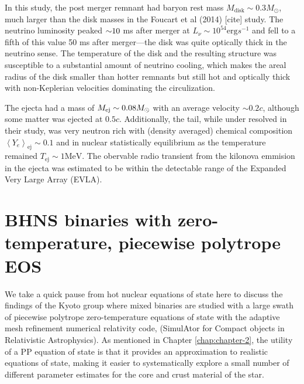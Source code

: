 In this study, the post merger remnant had baryon rest mass $M_\textrm{disk} \sim 0.3 M_\odot$, much larger than the disk masses in the Foucart et al (2014) [cite] study.  The neutrino luminosity peaked $\mathord{\sim} 10$ ms after merger at $L_\nu \sim 10^{54} \textrm{erg} s^{-1}$ and fell to a fifth of this value 50 ms after merger---the disk was quite optically thick in the neutrino sense.  The temperature of the disk and the resulting structure was susceptible to a substantial amount of neutrino cooling, which makes the areal radius of the disk smaller than hotter remnants but still hot and optically thick with non-Keplerian velocities dominating the circulization.

The ejecta had a mass of $M_{\rm ej} \sim 0.08 M_\odot$ with an average velocity $\sim 0.2 c$, although some matter was ejected at $0.5 c$. Additionally, the tail, while under resolved in their study, was very neutron rich with (density averaged) chemical composition $\left\langle Y_e \right\rangle_\textrm{ej} \sim 0.1$  and in nuclear statistically equilibrium as the temperature remained $T_\textrm{ej} \sim 1 \textrm{MeV}$.  The obervable radio transient from the kilonova emmision in the ejecta was estimated to be within the detectable range of the Expanded Very Large Array (EVLA).

\section{BHNS binaries with zero-temperature, piecewise polytrope EOS}

We take a quick pause from hot nuclear equations of state here to discuss the findings of the Kyoto group where mixed binaries are studied with a large swath of piecewise polytrope zero-temperature equations of state with the adaptive mesh refinement numerical relativity code, \SACRA (SimulAtor for Compact objects in Relativistic Astrophysics).  
As mentioned in Chapter \ref{chap:chapter-2}, the utility of a PP equation of state is that it provides an approximation to realistic equations of state, making it easier to systematically explore a small number of different parameter estimates for the core and crust material of the star.  

